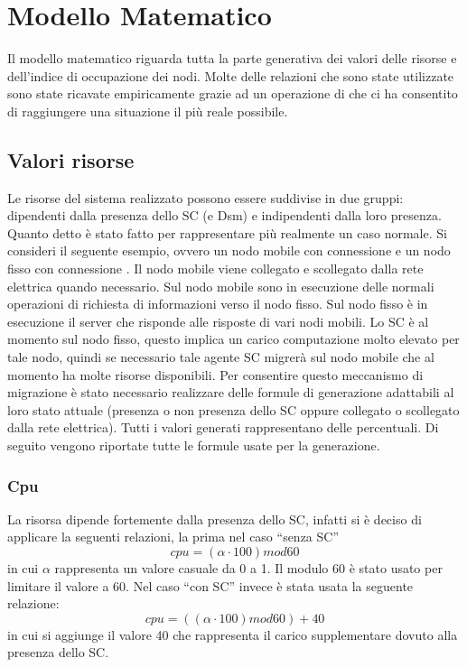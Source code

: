 \chapter{Modello Matematico}\label{cap:modello}
Il modello matematico riguarda tutta la parte generativa dei valori delle risorse e dell'indice di occupazione dei nodi. Molte delle relazioni che sono state utilizzate sono state ricavate empiricamente grazie ad un operazione di  che ci ha consentito di raggiungere una situazione il più reale possibile.
\section{Valori risorse}
Le risorse del sistema realizzato possono essere suddivise in due gruppi: dipendenti dalla presenza dello SC (e Dsm) e indipendenti dalla loro presenza. Quanto detto è stato fatto per rappresentare più realmente un caso normale. Si consideri il seguente esempio, ovvero un nodo mobile con connessione  e un nodo fisso con connessione . Il nodo mobile viene collegato e scollegato dalla rete elettrica quando necessario. Sul nodo mobile sono in esecuzione delle normali operazioni di richiesta di informazioni verso il nodo fisso. Sul nodo fisso è in esecuzione il server che risponde alle risposte di vari nodi mobili. Lo SC è al momento sul nodo fisso, questo implica un carico computazione molto elevato per tale nodo, quindi se necessario tale agente SC migrerà sul nodo mobile che al momento ha molte risorse disponibili. Per consentire questo meccanismo di migrazione è stato necessario realizzare delle formule di generazione adattabili al loro stato attuale (presenza o non presenza dello SC oppure collegato o scollegato dalla rete elettrica). Tutti i valori generati rappresentano delle percentuali. Di seguito vengono riportate tutte le formule usate per la generazione.
\subsection{Cpu}
La risorsa  dipende fortemente dalla presenza dello SC, infatti si è deciso di applicare la seguenti relazioni, la prima nel caso ``senza SC''
\begin{equation}
cpu = (\alpha \cdot 100) mod 60
\end{equation}
in cui $\alpha$ rappresenta un valore casuale da 0 a 1. Il modulo 60 è stato usato per limitare il valore a 60. Nel caso ``con SC'' invece è stata usata la seguente relazione:
\begin{equation}
cpu = ((\alpha \cdot 100) mod 60) + 40
\end{equation}
in cui si aggiunge il valore 40 che rappresenta il carico supplementare dovuto alla presenza dello SC.
